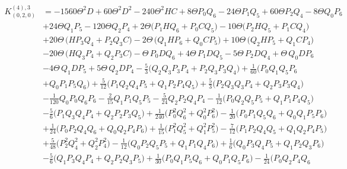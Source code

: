 \documentclass[12pt]{article}
\begin{document}
\begin{align}
K^{(4),3}_{(0,2,0)}&= -1560\Theta ^2 D +60 \Theta ^2 D^{2} -240 \Theta ^2 H C+8 \Theta   P_{0} Q_{6}-24 \Theta   P_{1} Q_{5}+60  \Theta  P_{2} Q_{4} -8 \Theta  Q_{0} P_{6}
\nonumber\\
 & +   24 \Theta   Q_{1} P_{5}-120 \Theta   Q_{2} P_{4}+ 2 \Theta   \big( P_{1} H Q_{6}+ P_{0} C Q_{5}\big)-10  \Theta   \big( P_{2} H Q_{5}+ P_{1} C Q_{4}\big) \nonumber\\
 &  +  20  \Theta \, \big( H  P_{3} Q_{4}+P_{2} Q_{3} C \big)-2  \Theta \, \big( Q_{1} H P_{6}+ Q_{0} C P_{5}\big)+ 10 \Theta \, \big( Q_{2} H P_{5}+ Q_{1} C P_{4}\big) \nonumber\\
 &- 20 \Theta \, \big(H  Q_{3} P_{4}  + Q_{2} P_{3} C \big)  - \Theta \,  P_{0}  D  Q_{6}+4 \Theta  \, P_{1}  D  Q_{5} -5 \Theta  \, P_{2}  D  Q_{4}  + \Theta \,  Q_{0}  D  P_{6}
  \nonumber\\
&- 4 \Theta \,  Q_{1}  D  P_{5} +5 \Theta \,  Q_{2}  D  P_{4}-\frac{5}{3} \big(  Q_{2}Q_{3} P_{3} P_{4} + P_{2}Q_{3} P_{3} Q_{4} \big) + \frac{1}{60} \big(  P_{0}Q_{1} Q_{5} P_{6}
 \nonumber\\
 &+  Q_{0}P_{1} P_{5} Q_{6} \big)+ \frac{5}{12} \big(  P_{1}Q_{2} Q_{4} P_{5}+ Q_{1}P_{2} P_{4} Q_{5} \big) +\frac{5}{3} \big(  P_{2}Q_{3} Q_{3} P_{4}+ Q_{2}P_{3} P_{3} Q_{4} \big) 
  \nonumber\\
 &- \frac{1}{120}  Q_{0} P_{0}  Q_{6}P_{6}-  \frac{2}{15}  Q_{1} P_{1}  Q_{5}P_{5}   - \frac{5}{24}  Q_{2} P_{2}  Q_{4}P_{4}-\frac{1}{12} \big(  P_{0}Q_{2} Q_{5} P_{5}+ Q_{1}P_{1} P_{4} Q_{5} \big)
 \nonumber\\
 &- \frac{5}{6} \big(  P_{1}Q_{3} Q_{4} P_{4}+ Q_{2}P_{2} P_{3} Q_{5} \big)  +\frac{1}{240} \big(   P^{2}_{0}  Q^{2}_{6}+ Q^{2}_{0} P^{2}_{6} \big)-\frac{1}{20} \big(  P_{0}P_{1}Q_{5} Q_{6} + Q_{0}Q_{1}P_{5} P_{6}  \big)
 \nonumber\\
&+ \frac{1}{24} \big(  P_{0}P_{2}Q_{4} Q_{6} + Q_{0}Q_{2}P_{4} P_{6}\big)+  \frac{1}{15} \big(   P^{2}_{1}  Q^{2}_{5}+ Q^{2}_{1} P^{2}_{5} \big)-\frac{7}{12} \big(  P_{1}P_{2}Q_{4} Q_{5} + Q_{1}Q_{2}P_{4} P_{5}\big)
\nonumber\\
 &+\frac{5}{48} \big(   P^{2}_{2}  Q^{2}_{4}+ Q^{2}_{2} P^{2}_{4} \big)     - \frac{1}{12} \big(  Q_{0}P_{2} Q_{5} P_{5}+ Q_{1}P_{1} Q_{4} P_{6}\big)+\frac{1}{6} \big(  Q_{0}P_{3} Q_{4} P_{5}+ Q_{1}P_{2} Q_{3} P_{6}\big)
 \nonumber\\
&-\frac{5}{6} \big(  Q_{1}P_{3} Q_{4} P_{4}+ Q_{2}P_{2} Q_{3} P_{5}\big)    +\frac{1}{30} \big( P_{0} Q_{1}  P_{5} Q_{6}+ Q_{0}P_{1} Q_{5} P_{6}\big)-\frac{1}{24} \big( P_{0} Q_{2}  P_{4} Q_{6}

\end{align}
\end{document}
